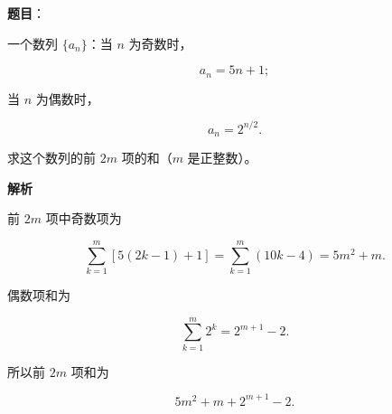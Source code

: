 \begin{answer}

\textbf{题目}：

一个数列 $\{a_n\}$：当 $n$ 为奇数时，

\nopagebreak[4]
\[
a_n=5n+1;
\]

当 $n$ 为偶数时，

\nopagebreak[4]
\[
a_n=2^{n/2}.
\]

求这个数列的前 $2m$ 项的和（$m$ 是正整数）。

\textbf{解析}

前 $2m$ 项中奇数项为

\nopagebreak[4]
\[
\sum_{k=1}^{m}\left[5(2k-1)+1\right]
=\sum_{k=1}^m(10k-4)
=5m^2+m.
\]

偶数项和为

\nopagebreak[4]
\[
\sum_{k=1}^{m}2^k=2^{m+1}-2.
\]

所以前 $2m$ 项和为

\nopagebreak[4]
\[
5m^2+m+2^{m+1}-2.
\]


\end{answer}
